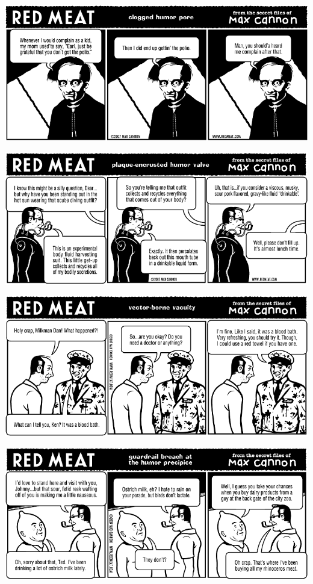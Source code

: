 \documentclass[a4paper,twoside,11pt]{article}
\begin{document}
\includegraphics[width=\textwidth]{redmeat_2007-08-28.png}



\includegraphics[width=\textwidth]{redmeat_2007-09-04.png}



\includegraphics[width=\textwidth]{redmeat_2007-09-11.png}



\includegraphics[width=\textwidth]{redmeat_2007-09-18.png}
\end{document}
